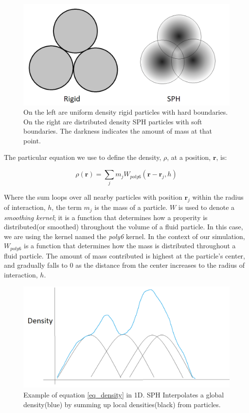\documentclass[]{article}
\begin{document}
	\begin{figure}[ht]
	  \centering
	  \includegraphics[width=6.0in]{images/RigidSPH}
	  \caption{On the left are uniform density rigid particles with hard boundaries. On the right are distributed density 
		SPH particles with soft boundaries. The darkness indicates the amount of mass at that point.}
	\end{figure}
	
	The particular equation we use to define the density, \(\rho\), at a position, \( \mathbf{r} \),  is:
	
	\begin{equation}
		\label{eq_density}
		\rho (\mathbf{r}) = \sum_{j}^{} m_j W_{poly6}(\mathbf{r} - \mathbf{r}_j, h)
	\end{equation}
	
	Where the sum loops over all nearby particles with position \( \mathbf{r}_j \) within the radius of interaction, 
	\( h \), the term \( m_j \) is the mass of a particle. \( W \) is used to denote a \textit{smoothing kernel}; it is
	a function that determines how a properity is distributed(or smoothed) throughout the volume of a fluid particle. 
	In this case, we are using the kernel named the \textit{poly6} kernel. In the context of our simulation, \( W_{poly6} \) 
	is a function that determines how the mass is distributed throughout a fluid particle. The amount of mass contributed is 
	highest at the particle's center, and gradually falls to 0 as the distance from the center increases to the radius of 
	interaction, \( h\).\\
	
	\begin{figure}[ht]
		\centering
		\includegraphics[width=6.0in]{images/SPHSum}
		\caption{Example of equation \ref{eq_density} in 1D. SPH Interpolates a global density(blue) by summing up local
		 densities(black) from particles.}
	\end{figure}
	
\end{document}
